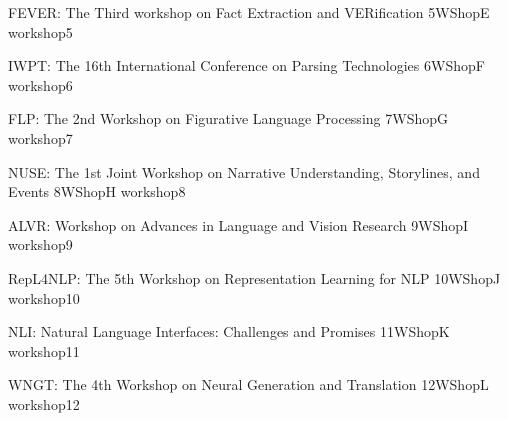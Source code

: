 \begin{wsschedule}
    {FEVER: The Third workshop on Fact Extraction and VERification}
    {5}{WShopE}
    {workshop5}
    {\WShopLocE}
    
\end{wsschedule}

\begin{wsschedule}
    {IWPT: The 16th International Conference on Parsing Technologies}
    {6}{WShopF}
    {workshop6}
    {\WShopLocF}
    
\end{wsschedule}

\begin{wsschedule}
    {FLP: The 2nd Workshop on Figurative Language Processing}
    {7}{WShopG}
    {workshop7}
    {\WShopLocG}
    
\end{wsschedule}

\begin{wsschedule}
    {NUSE: The 1st Joint Workshop on Narrative Understanding, Storylines, and Events}
    {8}{WShopH}
    {workshop8}
    {\WShopLocH}
    
\end{wsschedule}

\begin{wsschedule}
    {ALVR: Workshop on Advances in Language and Vision Research}
    {9}{WShopI}
    {workshop9}
    {\WShopLocI}
    
\end{wsschedule}

\begin{wsschedule}
    {RepL4NLP: The 5th Workshop on Representation Learning for NLP}
    {10}{WShopJ}
    {workshop10}
    {\WShopLocJ}
    
\end{wsschedule}



\begin{wsschedule}
    {NLI: Natural Language Interfaces: Challenges and Promises}
    {11}{WShopK}
    {workshop11}
    {\WShopLocK}
    
\end{wsschedule}

\begin{wsschedule}
    {WNGT: The 4th Workshop on Neural Generation and Translation}
    {12}{WShopL}
    {workshop12}
    {\WShopLocL}
    
\end{wsschedule}

